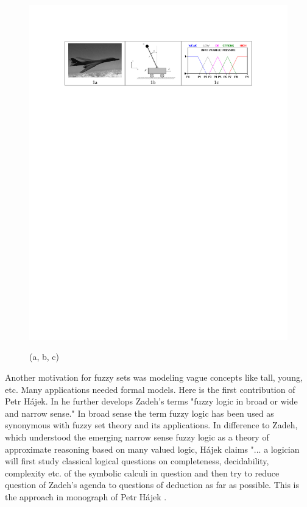 \begin{figure}[htbp]
	\centering
		\includegraphics[width=1.00\textwidth]{img/img1}
	\label{fig:img1}
	\caption{(a, b, c)}
\end{figure}



     Another motivation for fuzzy sets was modeling vague concepts like tall, young, etc. Many applications needed formal models. Here is the first contribution of Petr H\'{a}jek. In \cite{Ha2} he further develops Zadeh's terms "fuzzy logic in broad or wide and narrow sense." In broad sense the term fuzzy logic has been used as synonymous with fuzzy set theory and its applications. In difference to Zadeh, which understood the emerging narrow sense fuzzy logic as a theory of approximate reasoning based on many valued logic, H\'{a}jek claims "... a logician will first study classical logical questions on completeness, decidability, complexity etc. of the symbolic calculi in question and then try to reduce question of Zadeh's agenda to questions of deduction as far as possible.  This is the approach in monograph of Petr H\'{a}jek \cite{Ha}. 
     
